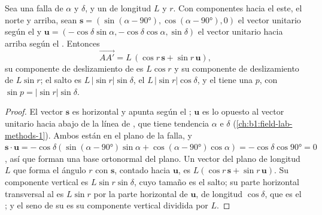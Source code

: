 \begin{proposition}\label{prop:b1:faults-folds-fabrics:slip-components}
Sea una falla de  $\alpha$ y  $\delta$, y un  de
longitud $L$ y  $r$. Con componentes hacia el este, el norte y arriba, sean
$\mathbf s = (\sin(\alpha-\ang{90}), \cos(\alpha-\ang{90}), 0)$ el vector unitario según el  y
$\mathbf u = (-\cos\delta\sin\alpha,
-\cos\delta\cos\alpha, \sin\delta)$ el vector unitario hacia arriba según el . Entonces
\[
  \overrightarrow{AA'} = L\,(\cos r\,\mathbf s + \sin r\,\mathbf u),
\]
su componente de deslizamiento de  es $L\cos r$ y su componente de deslizamiento de  $L\sin r$;
el salto es $L\,|\sin r|\sin\delta$, el  $L\,|\sin r|\cos\delta$, y el  tiene una  $p$, con $\sin p = |\sin r|\sin\delta$.
\end{proposition}

\begin{proof}
El vector $\mathbf s$ es horizontal y apunta según el ; $\mathbf u$ es lo opuesto al vector unitario hacia abajo de la
línea de , que tiene tendencia $\alpha$ e  $\delta$ (\cref{ch:b1:field-lab-methods-1}). Ambos están en el
plano de la falla, y $\mathbf s\cdot\mathbf u = -\cos\delta(\sin(\alpha -
\ang{90})\sin\alpha + \cos(\alpha - \ang{90})\cos\alpha) = -\cos\delta\cos\ang{90} = 0$,
así que forman una base ortonormal del plano. Un vector del plano de longitud $L$ que forma el ángulo $r$ con $\mathbf s$,
contado hacia $\mathbf u$, es $L(\cos r\,\mathbf s + \sin r\,\mathbf u)$. Su componente vertical es
$L\sin r\sin\delta$, cuyo tamaño es el salto; su parte horizontal transversal al  es $L\sin r$ por la parte horizontal de
$\mathbf u$, de longitud $\cos\delta$, que es el ; y el seno de su  es su componente vertical
dividida por $L$.
\end{proof}


